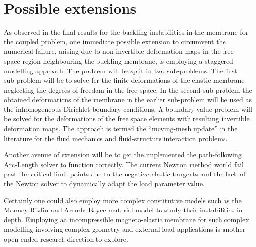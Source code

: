 \section*{Possible extensions}
As observed in the final results for the buckling instabilities in the membrane for the coupled problem, one immediate possible extension to circumvent the numerical failure, arising due to non-invertible deformation maps in the free space region neighbouring the buckling membrane, is employing a staggered modelling approach. The problem will be split in two sub-problems. The first sub-problem will be to solve for the finite deformations of the elastic membrane neglecting the degrees of freedom in the free space. In the second sub-problem the obtained deformations of the membrane in the earlier sub-problem will be used as the inhomogeneous Dirichlet boundary conditions. A boundary value problem will be solved for the deformations of the free space elements with resulting invertible deformation maps. The approach is termed the ``moving-mesh update'' in the literature for the fluid mechanics and fluid-structure interaction problems. \par 
Another avenue of extension will be to get the implemented the path-following Arc-Length solver to function correctly. The current Newton method would fail past the critical limit points due to the negative elastic tangents and the lack of the Newton solver to dynamically adapt the load parameter value. \par 
Certainly one could also employ more complex constitutive models such as the Mooney-Rivlin and Arruda-Boyce material model to study their instabilities in depth. Employing an incompressible magneto-elastic membrane for such complex modelling involving complex geometry and external load applications is another open-ended research direction to explore.